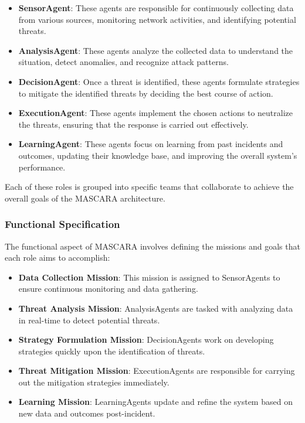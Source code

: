 \documentclass[conference]{IEEEtran}
\begin{document}
\begin{itemize}
    \item \textbf{SensorAgent}: These agents are responsible for continuously collecting data from various sources, monitoring network activities, and identifying potential threats.
    \item \textbf{AnalysisAgent}: These agents analyze the collected data to understand the situation, detect anomalies, and recognize attack patterns.
    \item \textbf{DecisionAgent}: Once a threat is identified, these agents formulate strategies to mitigate the identified threats by deciding the best course of action.
    \item \textbf{ExecutionAgent}: These agents implement the chosen actions to neutralize the threats, ensuring that the response is carried out effectively.
    \item \textbf{LearningAgent}: These agents focus on learning from past incidents and outcomes, updating their knowledge base, and improving the overall system's performance.
\end{itemize}

Each of these roles is grouped into specific teams that collaborate to achieve the overall goals of the MASCARA architecture.

\subsubsection*{Functional Specification}

The functional aspect of MASCARA involves defining the missions and goals that each role aims to accomplish:

\begin{itemize}
    \item \textbf{Data Collection Mission}: This mission is assigned to SensorAgents to ensure continuous monitoring and data gathering.
    \item \textbf{Threat Analysis Mission}: AnalysisAgents are tasked with analyzing data in real-time to detect potential threats.
    \item \textbf{Strategy Formulation Mission}: DecisionAgents work on developing strategies quickly upon the identification of threats.
    \item \textbf{Threat Mitigation Mission}: ExecutionAgents are responsible for carrying out the mitigation strategies immediately.
    \item \textbf{Learning Mission}: LearningAgents update and refine the system based on new data and outcomes post-incident.
\end{itemize}
\end{document}
